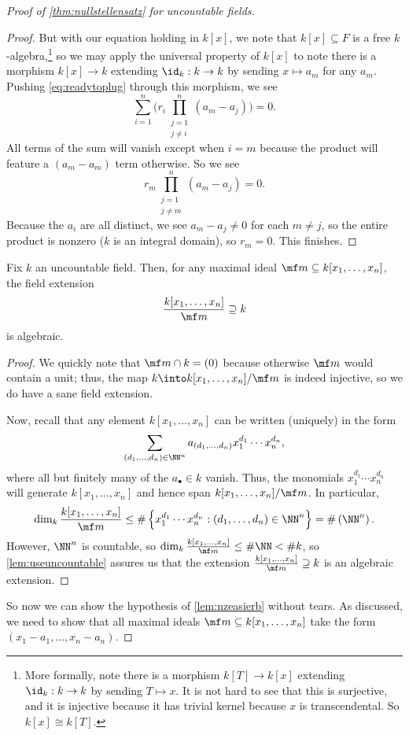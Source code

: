 \begin{proof}[Proof of \autoref{thm:nullstellensatz} for uncountable fields]
\begin{proof}
		But with our equation holding in $k[x]$, we note that $k[x]\subseteq F$ is a free $k$-algebra,\footnote{More formally, note there is a morphism $k[T]\to k[x]$ extending $\id_k:k\to k$ by sending $T\mapsto x$. It is not hard to see that this is surjective, and it is injective because it has trivial kernel because $x$ is transcendental. So $k[x]\cong k[T]$.} so we may apply the universal property of $k[x]$ to note there is a morphism $k[x]\to k$ extending $\id_k:k\to k$ by sending $x\mapsto a_m$ for any $a_m$. Pushing \autoref{eq:readytoplug} through this morphism, we see
		\[\sum_{i=1}^n\Bigg(r_i\prod_{\substack{j=1\\j\ne i}}^n(a_m-a_j)\Bigg)=0.\]
		All terms of the sum will vanish except when $i=m$ because the product will feature a $(a_m-a_m)$ term otherwise. So we see
		\[r_m\prod_{\substack{j=1\\j\ne m}}^n(a_m-a_j)=0.\]
		Because the $a_i$ are all distinct, we see $a_m-a_j\ne0$ for each $m\ne j$, so the entire product is nonzero ($k$ is an integral domain), so $r_m=0$. This finishes.
	\end{proof}
	\begin{corollary} \label{cor:forcealgebraic}
		Fix $k$ an uncountable field. Then, for any maximal ideal $\mf m\subseteq k[x_1,\ldots,x_n]$, the field extension
		\[\frac{k[x_1,\ldots,x_n]}{\mf m}\supseteq k\]
		is algebraic.
	\end{corollary}
	\begin{proof}
		We quickly note that $\mf m\cap k=(0)$ because otherwise $\mf m$ would contain a unit; thus, the map $k\into k[x_1,\ldots,x_n]/\mf m$ is indeed injective, so we do have a sane field extension.
		
		Now, recall that any element $k[x_1,\ldots,x_n]$ can be written (uniquely) in the form
		\[\sum_{(d_1,\ldots,d_n)\in\NN^n}a_{(d_1,\ldots,d_n)}x_1^{d_1}\cdots x_n^{d_n},\]
		where all but finitely many of the $a_\bullet\in k$ vanish. Thus, the monomials $x_1^{d_1}\cdots x_n^{d_n}$ will generate $k[x_1,\ldots,x_n]$ and hence span $k[x_1,\ldots,x_n]/\mf m$. In particular,
		\[\dim_k\frac{k[x_1,\ldots,x_n]}{\mf m}\le\#\left\{x_1^{d_1}\cdots x_n^{d_n}:(d_1,\ldots,d_n)\in\NN^n\right\}=\#\left(\NN^n\right).\]
		However, $\NN^n$ is countable, so $\dim_k\frac{k[x_1,\ldots,x_n]}{\mf m}\le\#\NN<\#k$, so \autoref{lem:useuncountable} assures us that the extension $\frac{k[x_1,\ldots,x_n]}{\mf m}\supseteq k$ is an algebraic extension.
	\end{proof}
	So now we can show the hypothesis of \autoref{lem:nzeasierb} without tears. As discussed, we need to show that all maximal ideals $\mf m\subseteq k[x_1,\ldots,x_n]$ take the form $(x_1-a_1,\ldots,x_n-a_n)$.
	

\end{proof}
